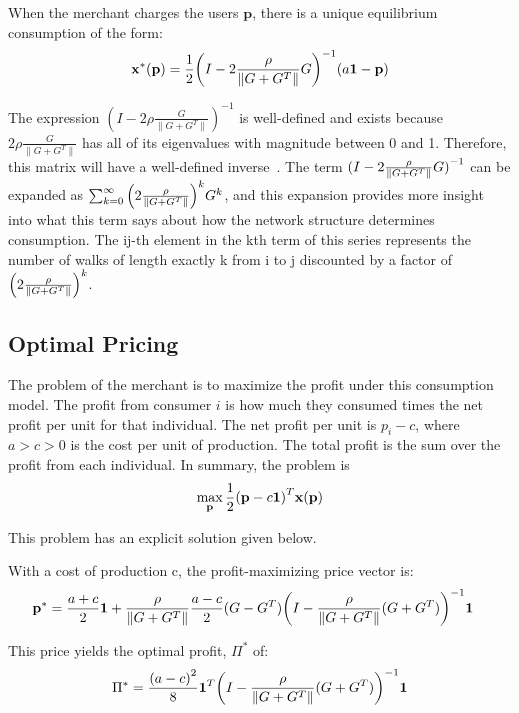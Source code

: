 \begin{proposition}
    When the merchant charges the users $\textbf{p}$, there is a unique equilibrium consumption of the form:
    \begin{equation}
        \mathbf{x}^*(\mathbf{p}) = \frac{1}{2} {\left(I - 2\frac{\rho}{\|G+G^T\|} G\right)}^{-1} (a\mathbf{1} - \mathbf{p}) 
    \end{equation}
\end{proposition}


The expression $ {\left( I - 2\rho\frac{G}{\|G + G^T\|}\right)}^{-1} $ is well-defined and exists because $2 \rho \frac{G}{\| G +G^T\|}$ has all of its eigenvalues with magnitude between 0 and 1. Therefore, this matrix will have a well-defined inverse~\cite{fan1949theorem}. The term ${(I - 2\frac{\rho}{\|G+G^T\|} G)}^{-1}$ can be expanded as $\sum_{k=0}^\infty {\left(2\frac{\rho}{\|G+G^T\|}\right)}^k G^k$, and this expansion provides more insight into what this term says about how the network structure determines consumption. The ij-th element in the kth term of this series represents the number of walks of length exactly k from i to j discounted by a factor of ${\left(2 \frac{\rho}{\|G+G^T\|}\right)}^k$. 

\subsection{Optimal Pricing}
The problem of the merchant is to maximize the profit under this consumption model. The profit from consumer $i$ is how much they consumed times the net profit per unit for that individual. The net profit per unit is $p_i - c$, where $a>c>0$ is the cost per unit of production. The total profit is the sum over the profit from each individual. In summary, the problem is 
\begin{equation}
    \max_{\mathbf{p}} \frac{1}{2} {(\mathbf{p} - c \mathbf{1} )}^T \mathbf{x} (\mathbf{p}) 
\end{equation}

This problem has an explicit solution given below. 
\begin{proposition}
    With a cost of production c, the profit-maximizing price vector is:
    \begin{align*}
        \bp^* &= %
         \frac{a+c}{2} \bo  + \rhof \frac{a-c}{2}  (G-G^T) {\left(I - \rhof (G+G^T)\right)}^{-1} \bo
    \end{align*}

    This price yields the optimal profit, $\Pi^*$ of:
    \begin{equation}\label{eq:opt_prof}
        \Pi^* = \frac{{(a-c)}^2}{8} \mathbf{1}^T {\left(I - \frac{\rho}{\|G+G^T\|} (G+G^T) \right)}^{-1} \mathbf{1}
    \end{equation}
\end{proposition}

